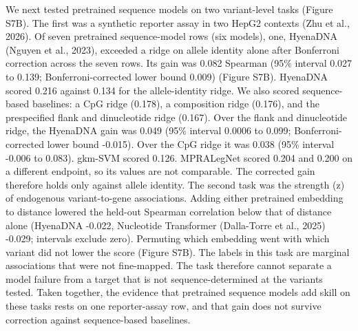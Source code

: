 We next tested pretrained sequence models on two variant-level tasks (Figure
S7B). The first was a synthetic reporter assay in two HepG2 contexts (Zhu et al., 2026). Of seven pretrained sequence-model rows
(six models), one, HyenaDNA (Nguyen et al., 2023), exceeded a ridge on
allele identity alone after Bonferroni correction across the seven rows. Its
gain was 0.082 Spearman (95\% interval 0.027 to 0.139; Bonferroni-corrected
lower bound 0.009) (Figure S7B). HyenaDNA scored 0.216 against 0.134 for the
allele-identity ridge. We also scored sequence-based baselines: a CpG ridge
(0.178), a composition ridge (0.176), and the prespecified flank and
dinucleotide ridge (0.167). Over the flank and dinucleotide ridge, the HyenaDNA
gain was 0.049 (95\% interval 0.0006 to 0.099; Bonferroni-corrected lower bound
-0.015). Over the CpG ridge it was 0.038 (95\% interval -0.006 to 0.083).
gkm-SVM scored 0.126. MPRALegNet scored 0.204 and 0.200 on a different
endpoint, so its values are not comparable. The corrected gain therefore holds
only against allele identity. The second task was
the strength (\textbar z\textbar) of endogenous variant-to-gene associations. Adding either
pretrained embedding to distance lowered the held-out Spearman correlation below
that of distance alone (HyenaDNA -0.022, Nucleotide Transformer (Dalla-Torre et al., 2025) -0.029; intervals exclude zero). Permuting
which embedding went with which variant did not lower the score (Figure S7B).
The labels in this task are marginal associations that were not fine-mapped.
The task therefore cannot separate a model failure from a target that is not
sequence-determined at the variants tested. Taken together, the evidence that
pretrained sequence models add skill on these tasks rests on one reporter-assay
row, and that gain does not survive correction against sequence-based baselines.


